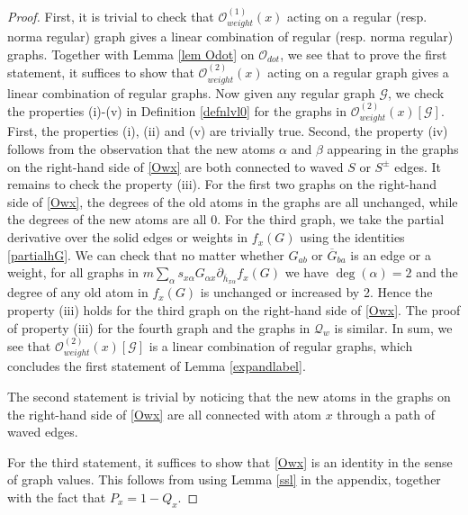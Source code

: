 \documentclass{article}
\newcommand{\1}{\mathds{1}}
\numberwithin{equation}{section}
\newcommand{\al}{\alpha}
\renewcommand{\cal}{\mathcal}
\theoremstyle{plain} %
\theoremstyle{remark}
\begin{document}
   \begin{proof} 
 First, it is trivial to check that ${\cal O}^{(1)}_{weight}(x)$ acting on a regular (resp. norma regular) graph gives a linear combination of regular (resp. norma regular) graphs. Together with Lemma \ref{lem Odot} on $\cal O_{dot}$, we see that to prove the first statement, it suffices to show that 
$ {\cal O}^{(2)}_{weight}(x) $  acting on a regular graph gives a linear combination of regular graphs. Now given any regular graph $\cal G$, we check the properties (i)-(v) in Definition \ref{defnlvl0} for the graphs in ${\cal O}^{(2)}_{weight}(x)[\cal G]$. First, the properties (i), (ii) and (v) are trivially true. Second, the property (iv) follows from the observation that the new atoms $\al$ and $\beta$ appearing in the graphs on the right-hand side of \eqref{Owx} are both connected to waved $S$ or $S^\pm$ edges. It remains to check the property (iii). For the first two graphs on the right-hand side of \eqref{Owx}, the degrees of the old atoms in the graphs are all unchanged, while the degrees of the new atoms are all 0. For the third graph, we take the partial derivative over the solid edges or weights in $f_x(G)$ using the identities \eqref{partialhG}. We can check that no matter whether $G_{ab}$ or $\overline G_{ba}$ is an edge or a weight, for all graphs in $m  \sum_{ \al} s_{x \al} G_{\al x}\partial_{\overline h_{x\al}} f_x(G)$ we have $\deg(\al)= 2$ and the degree of any old atom in $f_x(G)$ is unchanged or increased by 2. Hence the property (iii) holds for the third graph on the right-hand side of \eqref{Owx}. The proof of property (iii) for the fourth graph and the graphs in $\cal Q_w$ is similar. In sum, we see that ${\cal O}^{(2)}_{weight}(x)[\cal G]$ is a linear combination of regular graphs, which concludes the first statement of Lemma \ref{expandlabel}.


The second statement is trivial by noticing that the new atoms in the graphs on the right-hand side of \eqref{Owx} are all connected with atom $x$ through a path of waved edges.

For the third statement, it suffices to show that  \eqref{Owx} is an identity in the sense of graph values. This follows from using Lemma \ref{ssl} in the appendix, together with the fact that 
 $P_x = 1-Q_x$.


\end{proof}
\end{document}
